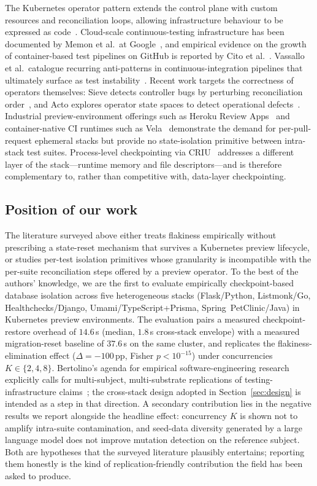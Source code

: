 The Kubernetes operator pattern extends the control plane with
custom resources and reconciliation loops, allowing infrastructure
behaviour to be expressed as
code~\cite{hausenblas2019programming}. Cloud-scale continuous-testing
infrastructure has been documented by Memon et al.\ at
Google~\cite{memon2017taming}, and empirical evidence on the growth of
container-based test pipelines on GitHub is reported by Cito et
al.~\cite{cito2017empirical}. Vassallo et al.\ catalogue recurring
anti-patterns in continuous-integration pipelines that ultimately surface as
test instability~\cite{vassallo2018context}. Recent work targets the
correctness of operators themselves: Sieve detects controller bugs by
perturbing reconciliation
order~\cite{li2022sieve}, and Acto explores operator state spaces to detect
operational defects~\cite{sun2022acto}. Industrial preview-environment
offerings such as Heroku Review Apps~\cite{heroku_review_apps} and
container-native CI runtimes such as Vela~\cite{vela_pipeline} demonstrate
the demand for per-pull-request ephemeral stacks but provide no
state-isolation primitive between intra-stack test suites. Process-level
checkpointing via CRIU~\cite{criu_project} addresses a different layer of
the stack---runtime memory and file descriptors---and is therefore
complementary to, rather than competitive with, data-layer checkpointing.

\subsection{Position of our work}
\label{sec:related:position}

The literature surveyed above either treats flakiness empirically without
prescribing a state-reset mechanism that survives a Kubernetes preview
lifecycle, or studies per-test isolation primitives whose granularity is
incompatible with the per-suite reconciliation steps offered by a preview
operator. To the best of the authors' knowledge, we are the first to
evaluate empirically checkpoint-based database isolation across five
heterogeneous stacks (Flask/Python, Listmonk/Go, Healthchecks/Django,
Umami/TypeScript+Prisma, Spring~PetClinic/Java) in Kubernetes preview
environments. The evaluation pairs a measured checkpoint-restore overhead of
$14.6$\,s (median, $1.8$\,s cross-stack envelope) with a measured
migration-reset baseline of $37.6$\,s on the same cluster, and replicates the
flakiness-elimination effect ($\Delta = -100$\,pp, Fisher
$p < 10^{-15}$) under concurrencies $K \in \{2,4,8\}$. Bertolino's agenda for
empirical software-engineering research explicitly calls for
multi-subject, multi-substrate replications of testing-infrastructure
claims~\cite{bertolino2007software}; the cross-stack design adopted in
Section~\ref{sec:design} is intended as a step in that direction. A
secondary contribution lies in the negative results we report alongside
the headline effect: concurrency $K$ is shown not to amplify intra-suite
contamination, and seed-data diversity generated by a large language model
does not improve mutation detection on the reference subject. Both are
hypotheses that the surveyed literature plausibly entertains; reporting
them honestly is the kind of replication-friendly contribution the field
has been asked to produce.

